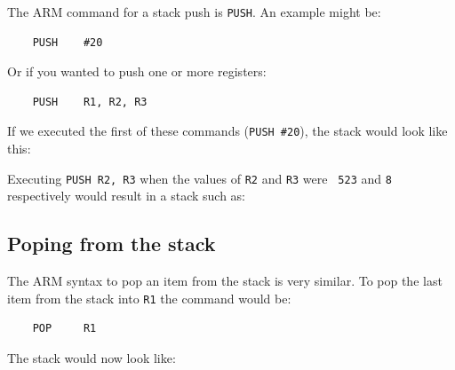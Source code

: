 The ARM command for a stack push is {\tt PUSH}. An example might be:

\begin{verbatim}
	PUSH 	#20
\end{verbatim}

Or if you wanted to push one or more registers:

\begin{verbatim}
	PUSH 	R1, R2, R3
\end{verbatim}

If we executed the first of these commands ({\tt PUSH \#20}), the stack would
look like this:

\begin{center}
\begin{drawstack}
		
		
		
		
		
\end{drawstack}
\end{center}

Executing {\tt PUSH R2, R3} when the values of {\tt R2} and {\tt R3} were {\tt
523} and {\tt 8} respectively would result in a stack such as:

\begin{center}
\begin{drawstack}
		
		
		
		
		
\end{drawstack}
\end{center}

\subsection{Poping from the stack}

The ARM syntax to pop an item from the stack is very similar. To pop the last
item from the stack into {\tt R1} the command would be:

\begin{verbatim}
	POP 	R1
\end{verbatim}

The stack would now look like:

\begin{center}
\begin{drawstack}
		
		
		
		
		
\end{drawstack}
\end{center}

